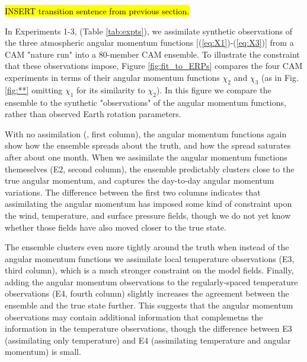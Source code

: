 \hl{INSERT transition sentence from previous section.}

In Experiments 1-3, (Table \ref{tab:expts}), we assimilate synthetic observations of the three atmospheric angular momentum functions [(\ref{eq:X1})-(\ref{eq:X3})] from a CAM "nature run" into a 80-member CAM ensemble. 
To illustrate the constraint that these observations impose, Figure \ref{fig:fit_to_ERPs} compares the four CAM experiments in terms of their angular momentum functions $\chi_2$ and $\chi_3$ (as in Fig. \ref{fig:**} omitting $\chi_1$ for its similarity to $\chi_2$).  
In this figure we compare the ensemble to the synthetic "observations" of the angular momentum functions, rather than observed Earth rotation parameters. 

With no assimilation (\NODA, first column), the angular momentum functions again show how the ensemble spreads about the truth, and how the spread saturates after about one month.
When we assimilate the angular momentum functions themeselves (E2, second column), the ensemble predictably clusters close to the true angular momentum, and captures the day-to-day angular momentum variations. 
The difference between the first two columns indicates that assimilating the angular momentum has imposed some kind of constraint upon the wind, temperature, and surface pressure fields, though we do not yet know whether those fields have also moved closer to the true state. 

The ensemble clusters even more tightly around the truth when instead of the angular momentum functions we assimilate local temperature observations (E3, third column), which is a much stronger constraint on the model fields. 
Finally, adding the angular momentum observations to the regularly-spaced temperature observations (E4, fourth column) slightly increases the agreement between the ensemble and the true state further.  
This suggests that the angular momentum observations may contain additional information that complemetns the information in the temperature observations, though the difference between E3 (assimilating only temperature) and E4 (assimilating temperature and angular momentum) is small.  
